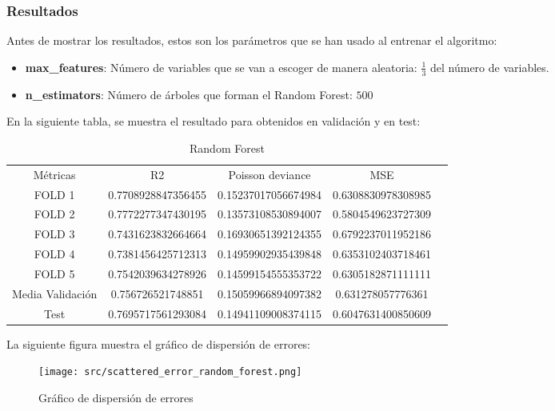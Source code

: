 \subsubsection{Resultados}
Antes de mostrar los resultados, estos son los parámetros que se han usado al entrenar el algoritmo:
\begin{itemize}
	\item \textbf{max\_features}:  Número de variables que se van a escoger de manera aleatoria: $\frac{1}{3}$ del número de variables.
	\item\textbf{n\_estimators}: Número de árboles que forman el Random Forest: $500$
\end{itemize}
En la siguiente tabla, se muestra el resultado para obtenidos en validación y en test:
\linebreak
\begin{table}[H]
	\begin{tabular}{|c|c|c|c|c}
		\cline{1-4}
		Métricas & R2                 & Poisson deviance    & MSE                \\ \cline{1-4}
		FOLD 1   & 0.7708928847356455 & 0.15237017056674984 & 0.6308830978308985 \\ \cline{1-4}
		FOLD 2   & 0.7772277347430195 & 0.13573108530894007 & 0.5804549623727309 \\ \cline{1-4}
		FOLD 3   & 0.7431623832664664 & 0.16930651392124355 & 0.6792237011952186 \\ \cline{1-4}
		FOLD 4   & 0.7381456425712313 & 0.14959902935439848 & 0.6353102403718461 \\ \cline{1-4}
		FOLD 5   & 0.7542039634278926 & 0.14599154555353722 & 0.6305182871111111 \\ \cline{1-4}
		Media  Validación   & 0.756726521748851  & 0.15059966894097382 & 0.631278057776361\\ \cline{1-4}
		Test     & 0.7695717561293084 & 0.14941109008374115 & 0.6047631400850609 \\ \cline{1-4}
	\end{tabular}
	\caption{Random Forest}
	\label{tab:res_random_forest}
\end{table}
La siguiente figura muestra el gráfico de dispersión de errores:\\
\linebreak
\begin{figure}[H]
	\centering
	\texttt{[image: src/scattered\_error\_random\_forest.png]}
	\caption{Gráfico de dispersión de errores}
	\label{fig:rf_scattered}
\end{figure}

